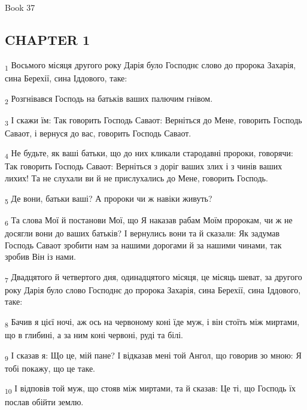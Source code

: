 Book 37
\subsection{CHAPTER 1}
\begin{tcolorbox}
\textsubscript{1} Восьмого місяця другого року Дарія було Господнє слово до пророка Захарія, сина Берехії, сина Іддового, таке:
\end{tcolorbox}
\begin{tcolorbox}
\textsubscript{2} Розгнівався Господь на батьків ваших палючим гнівом.
\end{tcolorbox}
\begin{tcolorbox}
\textsubscript{3} І скажи їм: Так говорить Господь Саваот: Верніться до Мене, говорить Господь Саваот, і вернуся до вас, говорить Господь Саваот.
\end{tcolorbox}
\begin{tcolorbox}
\textsubscript{4} Не будьте, як ваші батьки, що до них кликали стародавні пророки, говорячи: Так говорить Господь Саваот: Верніться з доріг ваших злих і з чинів ваших лихих! Та не слухали ви й не прислухались до Мене, говорить Господь.
\end{tcolorbox}
\begin{tcolorbox}
\textsubscript{5} Де вони, батьки ваші? А пророки чи ж навіки живуть?
\end{tcolorbox}
\begin{tcolorbox}
\textsubscript{6} Та слова Мої й постанови Мої, що Я наказав рабам Моїм пророкам, чи ж не досягли вони до ваших батьків? І вернулись вони та й сказали: Як задумав Господь Саваот зробити нам за нашими дорогами й за нашими чинами, так зробив Він із нами.
\end{tcolorbox}
\begin{tcolorbox}
\textsubscript{7} Двадцятого й четвертого дня, одинадцятого місяця, це місяць шеват, за другого року Дарія було слово Господнє до пророка Захарія, сина Берехії, сина Іддового, таке:
\end{tcolorbox}
\begin{tcolorbox}
\textsubscript{8} Бачив я цієї ночі, аж ось на червоному коні їде муж, і він стоїть між миртами, що в глибині, а за ним коні червоні, руді та білі.
\end{tcolorbox}
\begin{tcolorbox}
\textsubscript{9} І сказав я: Що це, мій пане? І відказав мені той Ангол, що говорив зо мною: Я тобі покажу, що це таке.
\end{tcolorbox}
\begin{tcolorbox}
\textsubscript{10} І відповів той муж, що стояв між миртами, та й сказав: Це ті, що Господь їх послав обійти землю.
\end{tcolorbox}

